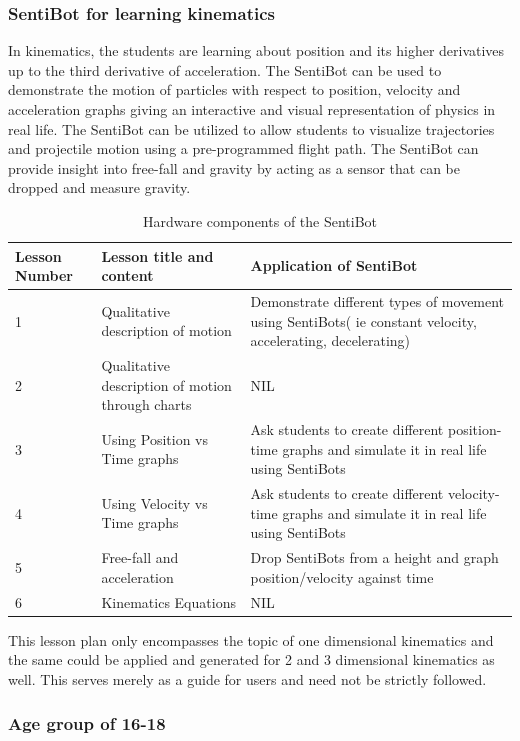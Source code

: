 \documentclass[12pt]{article}
\begin{document}
\subsubsection{SentiBot for learning kinematics}

In kinematics, the students are learning about position and its higher derivatives up to the third derivative of acceleration. The SentiBot can be used to demonstrate the motion of particles with respect to position, velocity and acceleration graphs giving an interactive and visual representation of physics in real life.  The SentiBot can be utilized to allow students to visualize trajectories and projectile motion using a pre-programmed flight path. The SentiBot can provide insight into free-fall and gravity by acting as a sensor that can be dropped and measure gravity.

\begin{table}[h]
	\centering
	\begin{tabularx}{\linewidth}{ | >{\setlength\hsize{.2\hsize}} X | >{\setlength\hsize{.5\hsize}} X | X | }
		Lesson Number & Lesson title and content & Application of SentiBot \\
		\hline
		1 & Qualitative description of motion & Demonstrate different types of movement using SentiBots( ie constant velocity, accelerating, decelerating) \\
		2 & Qualitative description of motion through charts & NIL \\
		3 & Using Position vs Time graphs & Ask students to create different position-time graphs and simulate it in real life using SentiBots \\
		4 & Using Velocity vs Time graphs & Ask students to create different velocity-time graphs and simulate it in real life using SentiBots \\
		5 & Free-fall and acceleration & Drop SentiBots from a height and graph position/velocity against time \\
		6 & Kinematics Equations & NIL \\
	\end{tabularx}
	\caption{Hardware components of the SentiBot}
	\label{fig:sb-components}
\end{table}

This lesson plan only encompasses the topic of one dimensional kinematics and the same could be applied and generated for 2 and 3 dimensional kinematics as well. This serves merely as a guide for users and need not be strictly followed.

\subsubsection{Age group of 16-18}
\end{document}
